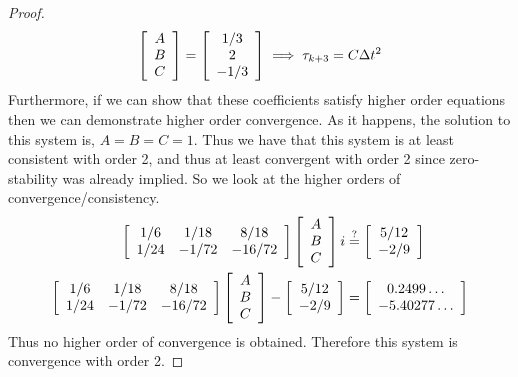\documentclass{article}
\begin{document}
\begin{enumerate}[label=\alph*)]
\begin{proof}
\begin{align*}
            \left[\begin{array}{c}A\\B\\C \end{array}\right]
            =
            \left[\begin{array}{c}1/3\\2\\-1/3 \end{array}\right]
            \implies \tau_{k+3} = C\Delta t^2
        \end{align*}
        Furthermore, if we can show that these coefficients satisfy higher order
        equations then we can demonstrate higher order convergence. As it
        happens, the solution to this system is, $A = B = C = 1$. Thus we have
        that this system is at least consistent with order 2, and thus at least
        convergent with order 2 since zero-stability was already implied. So we look at
        the higher orders of convergence/consistency. 
        \begin{align*}
            \left[\begin{array}{c c c}1/6 & 1/18 & 8/18 \\ 1/24 & -1/72 & -16/72 \end{array}\right]
            \left[\begin{array}{c}A\\B\\C \end{array}\right]
            i&\stackrel{?}{=}
            \left[\begin{array}{c}5/12\\-2/9 \end{array}\right]\\
            \left[\begin{array}{c c c}1/6 & 1/18 & 8/18 \\ 1/24 & -1/72 & -16/72 \end{array}\right]
            \left[\begin{array}{c}A\\B\\C \end{array}\right]
            - 
            \left[\begin{array}{c}5/12\\-2/9 \end{array}\right] &= 
            \left[\begin{array}{c}0.2499\ldots\\-5.40277\ldots \end{array}\right]
        \end{align*}
        Thus no higher order of convergence is obtained. Therefore this system
        is convergence with order 2. 
    \end{proof}


\end{enumerate}
\end{document}
